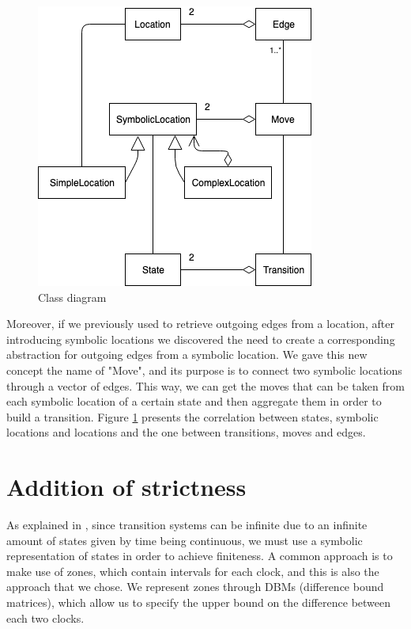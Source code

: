 \begin{figure}
  \centering
  \includegraphics[scale=0.7]{figures/umlTransitions.png}
  \caption{Class diagram}
  \label{fig:umlTransitions}
\end{figure}

Moreover, if we previously used to retrieve outgoing edges from a location, after introducing symbolic locations we discovered the need to create a corresponding abstraction for outgoing edges from a symbolic location. We gave this new concept the name of "Move", and its purpose is to connect two symbolic locations through a vector of edges. This way, we can get the moves that can be taken from each symbolic location of a certain state and then aggregate them in order to build a transition. Figure \ref{fig:umlTransitions} presents the correlation between states, symbolic locations and locations and the one between transitions, moves and edges.


\section{Addition of strictness} \label{sec:strictnessFix}

As explained in \textcite{Jecdar:2019}, since transition systems can be infinite due to an infinite amount of states given by time being continuous, we must use a symbolic representation of states in order to achieve finiteness. A common approach is to make use of zones, which contain intervals for each clock, and this is also the approach that we chose. We represent zones through DBMs (difference bound matrices), which allow us to specify the upper bound on the difference between each two clocks. 

